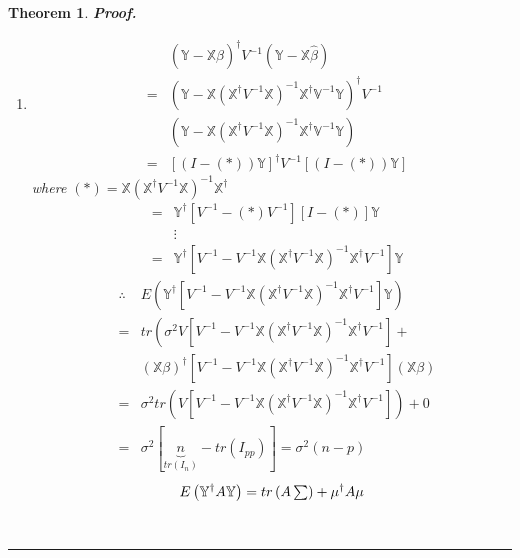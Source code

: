\documentclass{article}
\newtheorem{theorem}{Theorem}
\newenvironment{proof}[1][Proof]{\noindent\textbf{#1.} }{\ \rule{0.5em}{0.5em}}
\begin{document}
\begin{theorem}
\begin{proof}
\begin{enumerate}
\item 
\begin{eqnarray*}
&&\left( \mathbb{Y-X}\hat{\beta}\right) ^{\dagger }V^{-1}\left( \mathbb{Y-X}%
\hat{\beta}\right)  \\
&=&\left( \mathbb{Y-X}\left( \mathbb{X}^{\dagger }V^{-1}\mathbb{X}\right)
^{-1}\mathbb{X}^{\dagger }\mathbb{V}^{-1}\mathbb{Y}\right) ^{\dagger }V^{-1}
\\
&&\left( \mathbb{Y-X}\left( \mathbb{X}^{\dagger }V^{-1}\mathbb{X}\right)
^{-1}\mathbb{X}^{\dagger }\mathbb{V}^{-1}\mathbb{Y}\right)  \\
&=&\left[ \left( I-\left( \ast \right) \right) \mathbb{Y}\right] ^{\dagger
}V^{-1}\left[ \left( I-\left( \ast \right) \right) \mathbb{Y}\right] 
\end{eqnarray*}%
where $(\ast )=\mathbb{X}\left( \mathbb{X}^{\dagger }V^{-1}\mathbb{X}\right)
^{-1}\mathbb{X}^{\dagger }$%
\begin{eqnarray*}
&=&\mathbb{Y}^{\dagger }\left[ V^{-1}-\left( \ast \right) V^{-1}\right] %
\left[ I-\left( \ast \right) \right] \mathbb{Y} \\
&&\vdots  \\
&=&\mathbb{Y}^{\dagger }\left[ V^{-1}-V^{-1}\mathbb{X}\left( \mathbb{X}%
^{\dagger }V^{-1}\mathbb{X}\right) ^{-1}\mathbb{X}^{\dagger }V^{-1}\right] 
\mathbb{Y}
\end{eqnarray*}%
\newline
\newline
\begin{eqnarray*}
&\therefore &E\left( \mathbb{Y}^{\dagger }\left[ V^{-1}-V^{-1}\mathbb{X}%
\left( \mathbb{X}^{\dagger }V^{-1}\mathbb{X}\right) ^{-1}\mathbb{X}^{\dagger
}V^{-1}\right] \mathbb{Y}\right)  \\
&=&tr\left( \sigma ^{2}V\left[ V^{-1}-V^{-1}\mathbb{X}\left( \mathbb{X}%
^{\dagger }V^{-1}\mathbb{X}\right) ^{-1}\mathbb{X}^{\dagger }V^{-1}\right]
+\right.  \\
&&\left( \mathbb{X}\beta \right) ^{\dagger }\left[ V^{-1}-V^{-1}\mathbb{X}%
\left( \mathbb{X}^{\dagger }V^{-1}\mathbb{X}\right) ^{-1}\mathbb{X}^{\dagger
}V^{-1}\right] \left( \mathbb{X}\beta \right)  \\
&=&\sigma ^{2}tr\left( V\left[ V^{-1}-V^{-1}\mathbb{X}\left( \mathbb{X}%
^{\dagger }V^{-1}\mathbb{X}\right) ^{-1}\mathbb{X}^{\dagger }V^{-1}\right]
\right) +0 \\
&=&\sigma ^{2}\left[ \underset{tr\left( I_{n}\right) }{\underbrace{n}}%
-tr\left( I_{pp}\right) \right] =\sigma ^{2}\left( n-p\right) 
\end{eqnarray*}%
\newline
\newline
\begin{equation*}
E\left( \mathbb{Y}^{\dagger }A\mathbb{Y}\right) =tr\left( A\tsum \right)
+\mu ^{\dagger }A\mu 
\end{equation*}
\end{enumerate}
\end{proof}
\end{theorem}
\end{document}
